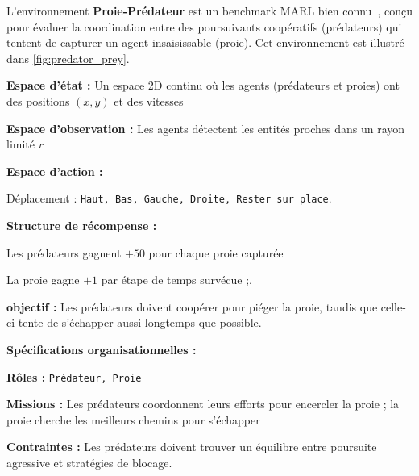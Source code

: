 L'environnement \textbf{Proie-Prédateur} est un benchmark MARL bien connu~\cite{lowe2017multi}, conçu pour évaluer la coordination entre des poursuivants coopératifs (prédateurs) qui tentent de capturer un agent insaisissable (proie). Cet environnement est illustré dans \autoref{fig:predator_prey}.
%
\begin{enumerate*}[label={\roman*)}, itemjoin={; \quad}]
  \item \textbf{Espace d'état :} Un espace 2D continu où les agents (prédateurs et proies) ont des positions $(x, y)$ et des vitesses
  \item \textbf{Espace d'observation :} Les agents détectent les entités proches dans un rayon limité $r$
  \item \textbf{Espace d'action :}
  \begin{enumerate*}[label={\roman*)}, itemjoin={; \quad}]
    \item Déplacement : \texttt{Haut, Bas, Gauche, Droite, Rester sur place}.
  \end{enumerate*}
  \item \textbf{Structure de récompense :}
  \begin{enumerate*}[label={\roman*)}, itemjoin={; \quad}]
    \item Les prédateurs gagnent $+50$ pour chaque proie capturée
    \item La proie gagne $+1$ par étape de temps survécue ;.
  \end{enumerate*}
  \item \textbf{objectif :} Les prédateurs doivent coopérer pour piéger la proie, tandis que celle-ci tente de s'échapper aussi longtemps que possible.
\end{enumerate*}
%
\textbf{Spécifications organisationnelles :}
\begin{enumerate*}[label={\roman*)}, itemjoin={; \quad}]
  \item \textbf{Rôles :} \texttt{Prédateur, Proie}
  \item \textbf{Missions :} Les prédateurs coordonnent leurs efforts pour encercler la proie ; la proie cherche les meilleurs chemins pour s'échapper
  \item \textbf{Contraintes :} Les prédateurs doivent trouver un équilibre entre poursuite agressive et stratégies de blocage.
\end{enumerate*}
%
